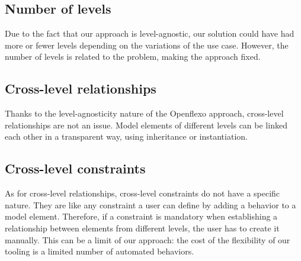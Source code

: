 
  \subsection{Number of levels}

  Due to the fact that our approach is level-agnostic, our solution could have had more
  or fewer levels depending on the variations of the use case. However, the number of levels is related
  to the problem, making the approach fixed.

  \subsection{Cross-level relationships}


  Thanks to the level-agnosticity nature of the Openflexo approach, cross-level
  relationships are not an issue. Model elements of different levels can be
  linked each other in a transparent way, using inheritance or instantiation.

  \subsection{Cross-level constraints}


  As for cross-level relationships, cross-level constraints do not have a
  specific nature. They are like any constraint a user can define by adding a
  behavior to a model element. Therefore, if a constraint is mandatory when
  establishing a relationship between elements from different levels, the user
  has to create it manually. This can be a limit of our approach: the cost of
  the flexibility of our tooling is a limited number of automated behaviors. 
  
  

